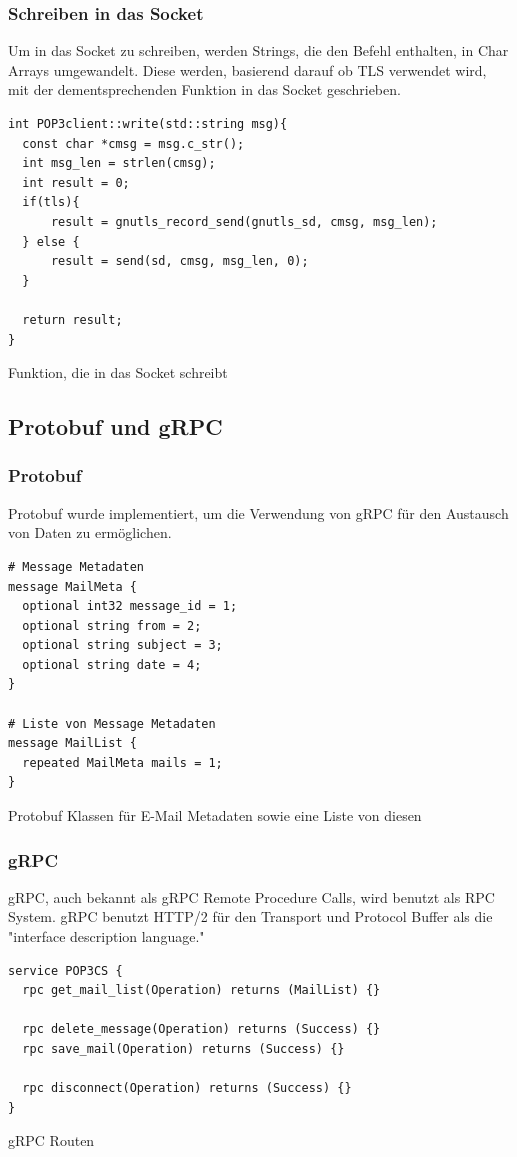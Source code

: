 \documentclass[12pt, letterpaper]{article}
\newenvironment{code}{\captionsetup{type=listing}}{}
\begin{document}
\subsubsection{Schreiben in das Socket}

Um in das Socket zu schreiben, werden Strings, die den Befehl enthalten, in Char Arrays umgewandelt. Diese werden, basierend darauf ob TLS verwendet wird, mit der dementsprechenden Funktion in das Socket geschrieben.

\begin{code}
\begin{verbatim}
int POP3client::write(std::string msg){
  const char *cmsg = msg.c_str();
  int msg_len = strlen(cmsg);
  int result = 0;
  if(tls){
      result = gnutls_record_send(gnutls_sd, cmsg, msg_len);
  } else {
      result = send(sd, cmsg, msg_len, 0);
  }

  return result;
}
\end{verbatim}
\caption{Funktion, die in das Socket schreibt}
\label{write_in_socket}
\end{code}

\subsection{Protobuf und gRPC}
\subsubsection{Protobuf}
Protobuf\cite{protobuf} wurde implementiert, um die Verwendung von gRPC für den Austausch von Daten zu ermöglichen.
\begin{code}
  \begin{verbatim}
# Message Metadaten
message MailMeta {
  optional int32 message_id = 1;
  optional string from = 2;
  optional string subject = 3;
  optional string date = 4;
}

# Liste von Message Metadaten
message MailList {
  repeated MailMeta mails = 1;
}
  \end{verbatim}
  \caption{Protobuf Klassen für E-Mail Metadaten sowie eine Liste von diesen}
  \label{proto}
\end{code}

\subsubsection{gRPC}

gRPC\cite{grpc}, auch bekannt als gRPC Remote Procedure Calls, wird benutzt als RPC System. gRPC benutzt HTTP/2 für den Transport und Protocol Buffer als die "interface description language."
\begin{code}
  \begin{verbatim}
service POP3CS {
  rpc get_mail_list(Operation) returns (MailList) {}

  rpc delete_message(Operation) returns (Success) {}
  rpc save_mail(Operation) returns (Success) {}

  rpc disconnect(Operation) returns (Success) {}
}
  \end{verbatim}
  \caption{gRPC Routen}
  \label{grpc}
\end{code}
\end{document}

